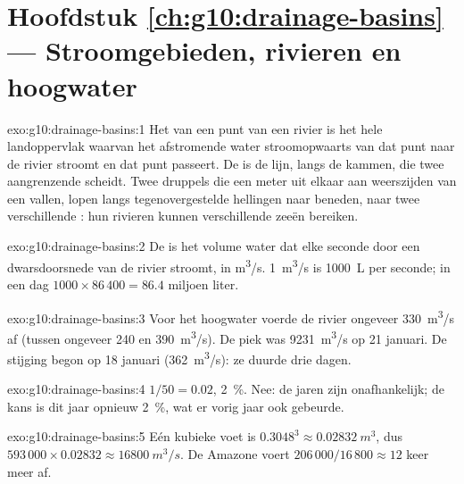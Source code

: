 \section*{Hoofdstuk \ref{ch:g10:drainage-basins} --- Stroomgebieden, rivieren en hoogwater}

\begin{solution}{exo:g10:drainage-basins:1}
Het  van een punt van een rivier is het hele landoppervlak waarvan
het afstromende water stroomopwaarts van dat punt naar de rivier stroomt en dat
punt passeert. De  is de lijn, langs de kammen, die twee
aangrenzende  scheidt. Twee druppels die een meter uit elkaar aan
weerszijden van een  vallen, lopen langs tegenovergestelde
hellingen naar beneden, naar twee verschillende : hun rivieren
kunnen verschillende zeeën bereiken.
\end{solution}

\begin{solution}{exo:g10:drainage-basins:2}
De  is het volume water dat elke seconde door een dwarsdoorsnede van de
rivier stroomt, in \unit{m^3/s}. \qty{1}{m^3/s} is \qty{1000}{L} per
seconde; in een dag $1000 \times 86\,400 = 86.4$ miljoen liter.
\end{solution}

\begin{solution}{exo:g10:drainage-basins:3}
Voor het hoogwater voerde de rivier ongeveer \qty{330}{m^3/s} af (tussen ongeveer
\num{240} en \qty{390}{m^3/s}). De piek was \qty{9231}{m^3/s} op
21 januari. De stijging begon op 18 januari (\qty{362}{m^3/s}): ze duurde drie
dagen.
\end{solution}

\begin{solution}{exo:g10:drainage-basins:4}
$1/50 = 0.02$, \qty{2}{\percent}. Nee: de jaren zijn onafhankelijk; de kans is
dit jaar opnieuw \qty{2}{\percent}, wat er vorig jaar ook gebeurde.
\end{solution}

\begin{solution}{exo:g10:drainage-basins:5}
Eén kubieke voet is $0.3048^3 \approx \qty{0.02832}{m^3}$, dus
$593\,000 \times 0.02832 \approx \qty{16800}{m^3/s}$. De Amazone voert
$206\,000/16\,800 \approx 12$ keer meer af.
\end{solution}

